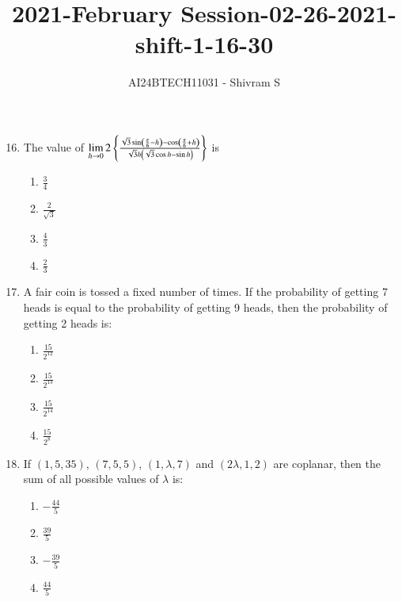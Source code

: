 \documentclass[journal]{IEEEtran}
\begin{document}

\onecolumn

\title{2021-February Session-02-26-2021-shift-1-16-30}
\author{AI24BTECH11031 - Shivram S}
\maketitle
\bigskip

\renewcommand{\thefigure}{\theenumi}
\renewcommand{\thetable}{\theenumi}

\begin{enumerate}
        \setcounter{enumi}{15}
    \item The value of $\lim\limits_{h \to 0} 2\left\{\frac{\sqrt{3}\sin\left(\frac{\pi}{6} - h\right) - \cos\left(\frac{\pi}{6} + h\right)}{\sqrt{3}h\left(\sqrt{3}\cos h - \sin h\right)}\right\}$ is
    
    \begin{multicols}{4}
    \begin{enumerate}
        \item $\frac{3}{4}$
        \item $\frac{2}{\sqrt{3}}$
        \item $\frac{4}{3}$
        \item $\frac{2}{3}$
    \end{enumerate}
    \end{multicols}

    \item A fair coin is tossed a fixed number of times. If the probability of
    getting 7 heads is equal to the probability of getting 9 heads, then the
    probability of getting 2 heads is:
    
    \begin{multicols}{4}
    \begin{enumerate}
        \item $\frac{15}{2^{12}}$
        \item $\frac{15}{2^{13}}$
        \item $\frac{15}{2^{14}}$
        \item $\frac{15}{2^{8}}$
    \end{enumerate}
    \end{multicols}

    \item If $(1, 5, 35)$, $(7, 5, 5)$, $(1, \lambda, 7)$ and $(2\lambda, 1, 2)$ are
    coplanar, then the sum of all possible values of $\lambda$ is:

    \begin{multicols}{4}
    \begin{enumerate}
        \item $-\frac{44}{5}$
        \item $\frac{39}{5}$
        \item $-\frac{39}{5}$
        \item $\frac{44}{5}$
    \end{enumerate}
    \end{multicols}


\end{enumerate}
\end{document}
